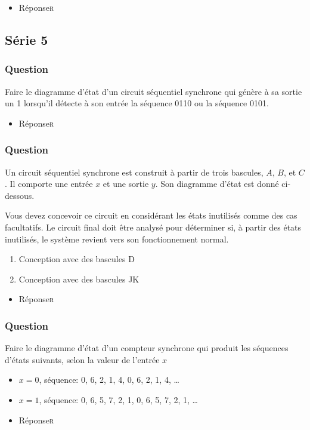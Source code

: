 \documentclass[11pt]{article}
\begin{document}
\begin{itemize}
\item Réponse\hfill{}\textsc{r}
\label{sec:org8404f9a}
\end{itemize}

\subsection*{Série 5}
\label{sec:org9d1a460}
\subsubsection*{Question}
\label{sec:orgd3b79ab}
Faire le diagramme d'état d'un circuit séquentiel synchrone qui génère
à sa sortie un 1 lorsqu'il détecte à son entrée la séquence 0110 ou la
séquence 0101.

\begin{itemize}
\item Réponse\hfill{}\textsc{r}
\label{sec:orgfe58195}
\end{itemize}

\subsubsection*{Question}
\label{sec:orgc4ac839}
Un circuit séquentiel synchrone est construit à partir de trois
   bascules, \(A\), \(B\), et \(C\). Il comporte une entrée \(x\) et
   une sortie \(y\). Son diagramme d'état est donné ci-dessous. 
\begin{center}

\end{center}

Vous devez concevoir ce circuit en considérant les états inutilisés
comme des cas facultatifs. Le circuit final doit être analysé pour
déterminer si, à partir des états inutilisés, le système revient vers
son fonctionnement normal.
\begin{enumerate}
\item Conception avec des bascules D
\item Conception avec des bascules JK
\end{enumerate}

\begin{itemize}
\item Réponse\hfill{}\textsc{r}
\label{sec:org39ee576}
\end{itemize}

\subsubsection*{Question}
\label{sec:orgd32911e}
Faire le diagramme d'état d'un compteur synchrone qui produit les
  séquences d'états suivants, selon la valeur de l'entrée \(x\)

\begin{itemize}
\item \(x=0\), séquence: 0, 6, 2, 1, 4, 0, 6, 2, 1, 4, \dots{}
\item \(x=1\), séquence: 0, 6, 5, 7, 2, 1, 0, 6, 5, 7, 2, 1, \dots{}
\end{itemize}

\begin{itemize}
\item Réponse\hfill{}\textsc{r}
\label{sec:org692f7c8}
\end{itemize}
\end{document}

